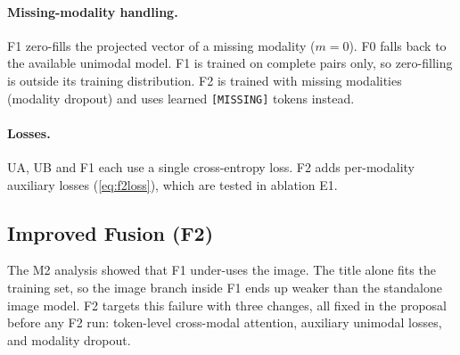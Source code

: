 \paragraph{Missing-modality handling.}
F1 zero-fills the projected vector of a missing modality ($m=0$). F0 falls back to the available unimodal model.
F1 is trained on complete pairs only, so zero-filling is outside its training distribution. F2 is trained
with missing modalities (modality dropout) and uses learned \texttt{[MISSING]} tokens instead.

\paragraph{Losses.}
UA, UB and F1 each use a single cross-entropy loss. F2 adds per-modality auxiliary losses (\cref{eq:f2loss}),
which are tested in ablation E1.

\subsection{Improved Fusion (F2)}
\label{sec:f2}

The M2 analysis showed that F1 under-uses the image. The title alone fits the training set, so the image branch
inside F1 ends up weaker than the standalone image model. F2 targets this failure with three changes, all fixed in
the proposal before any F2 run: token-level cross-modal attention, auxiliary unimodal losses, and modality dropout.

